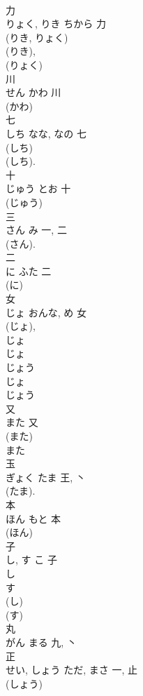 \documentclass[8pt]{extreport}
\begin{document}
\begin{CJK}{UTF8}{min}
\\	力	
\\	りょく, りき	ちから	力	
\\	(りき, りょく) 
\\	(りき), 
\\	(りょく) 
\\	川	
\\	せん	かわ	川	
\\	(かわ) 
\\	七	
\\	しち	なな, なの	七	
\\	(しち) 
\\	(しち). 
\\	十	
\\	じゅう	とお	十	
\\	(じゅう) 
\\	三	
\\	さん	み	一, 二	
\\	(さん). 
\\	二	
\\	に	ふた	二	
\\	(に) 
\\	女	
\\	じょ	おんな, め	女	
\\	(じょ), 
\\	じょ 
\\	じょ 
\\	じょう 
\\	じょ 
\\	じょう 
\\	又	
\\	また	又	
\\	(また) 
\\	また 
\\	玉	
\\	ぎょく	たま	王, 丶	
\\	(たま).	
\\	本	
\\	ほん	もと	本	
\\	(ほん) 
\\	子	
\\	し, す	こ	子	
\\	し 
\\	す 
\\	(し) 
\\	(す) 
\\	丸	
\\	がん	まる	九, 丶	
\\	正	
\\	せい, しょう	ただ, まさ	一, 止	
\\	(しょう) 

\end{CJK}
\end{document}
